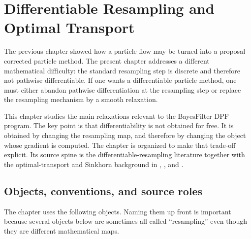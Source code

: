 \chapter{Differentiable Resampling and Optimal Transport}
\label{ch:bf-dpf-resampling-ot}

The previous chapter showed how a particle flow may be turned into a proposal-
corrected particle method.  The present chapter addresses a different
mathematical difficulty: the standard resampling step is discrete and therefore
not pathwise differentiable.  If one wants a differentiable particle method,
one must either abandon pathwise differentiation at the resampling step or
replace the resampling mechanism by a smooth relaxation.

This chapter studies the main relaxations relevant to the BayesFilter DPF
program.  The key point is that differentiability is not obtained for free.  It
is obtained by changing the resampling map, and therefore by changing the object
whose gradient is computed.  The chapter is organized to make that trade-off
explicit.  Its source spine is the differentiable-resampling literature
\citep{zhumurphyjonschkowski2020,corenflos2021differentiable} together with
the optimal-transport and Sinkhorn background in
\citet{villani2003topics}, \citet{cuturi2013sinkhorn}, and
\citet{peyre2019computational}.

\section{Objects, conventions, and source roles}
\label{sec:bf-dr-objects}

The chapter uses the following objects.  Naming them up front is important
because several objects below are sometimes all called ``resampling'' even
though they are different mathematical maps.

